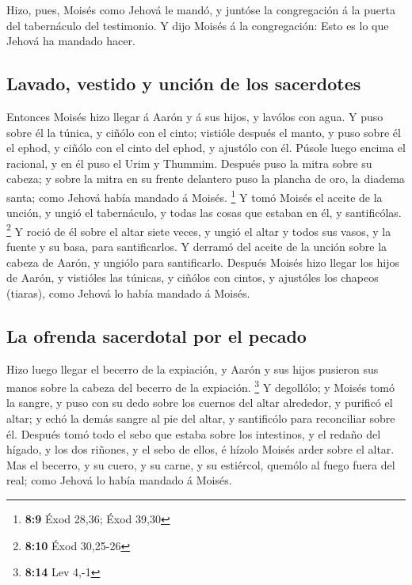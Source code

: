  Hizo, pues, Moisés como Jehová le mandó, y juntóse la
congregación á la puerta del tabernáculo del testimonio. 
Y dijo Moisés á la congregación: Esto es lo que Jehová ha mandado hacer.

\hypertarget{lavado-vestido-y-unciuxf3n-de-los-sacerdotes}{%
\subsection{Lavado, vestido y unción de los
sacerdotes}\label{lavado-vestido-y-unciuxf3n-de-los-sacerdotes}}

 Entonces Moisés hizo llegar á Aarón y á sus hijos, y
lavólos con agua.  Y puso sobre él la túnica, y ciñólo con
el cinto; vistióle después el manto, y puso sobre él el ephod, y ciñólo
con el cinto del ephod, y ajustólo con él.  Púsole luego
encima el racional, y en él puso el Urim y Thummim. 
Después puso la mitra sobre su cabeza; y sobre la mitra en su frente
delantero puso la plancha de oro, la diadema santa; como Jehová había
mandado á Moisés. \footnote{\textbf{8:9} Éxod 28,36; Éxod 39,30}
 Y tomó Moisés el aceite de la unción, y ungió el
tabernáculo, y todas las cosas que estaban en él, y santificólas.
\footnote{\textbf{8:10} Éxod 30,25-26}  Y roció de él
sobre el altar siete veces, y ungió el altar y todos sus vasos, y la
fuente y su basa, para santificarlos.  Y derramó del
aceite de la unción sobre la cabeza de Aarón, y ungiólo para
santificarlo.  Después Moisés hizo llegar los hijos de
Aarón, y vistióles las túnicas, y ciñólos con cintos, y ajustóles los
chapeos (tiaras), como Jehová lo había mandado á Moisés.

\hypertarget{la-ofrenda-sacerdotal-por-el-pecado}{%
\subsection{La ofrenda sacerdotal por el
pecado}\label{la-ofrenda-sacerdotal-por-el-pecado}}

 Hizo luego llegar el becerro de la expiación, y Aarón y
sus hijos pusieron sus manos sobre la cabeza del becerro de la
expiación. \footnote{\textbf{8:14} Lev 4,-1}  Y
degollólo; y Moisés tomó la sangre, y puso con su dedo sobre los cuernos
del altar alrededor, y purificó el altar; y echó la demás sangre al pie
del altar, y santificólo para reconciliar sobre él. 
Después tomó todo el sebo que estaba sobre los intestinos, y el redaño
del hígado, y los dos riñones, y el sebo de ellos, é hízolo Moisés arder
sobre el altar.  Mas el becerro, y su cuero, y su carne,
y su estiércol, quemólo al fuego fuera del real; como Jehová lo había
mandado á Moisés.

